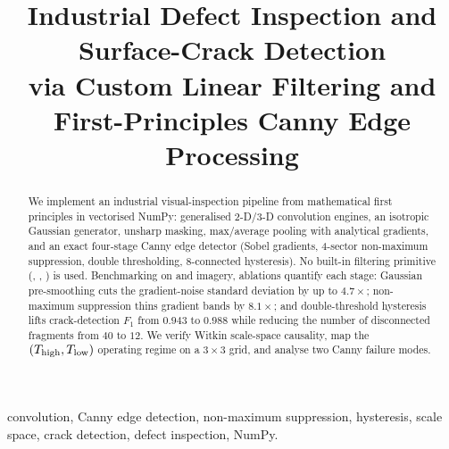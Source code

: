 \documentclass[conference]{IEEEtran}
\begin{document}
\title{Industrial Defect Inspection and Surface-Crack Detection\\
via Custom Linear Filtering and First-Principles Canny Edge Processing}

\author{%
}

\maketitle

\begin{abstract}
We implement an industrial visual-inspection pipeline from mathematical first
principles in vectorised NumPy: generalised 2-D/3-D convolution engines, an
isotropic Gaussian generator, unsharp masking, max/average pooling with
analytical gradients, and an exact four-stage Canny edge detector (Sobel
gradients, 4-sector non-maximum suppression, double thresholding, 8-connected
hysteresis). No built-in filtering primitive (,
, ) is used. Benchmarking on \PCB{} and
\CRACK{} imagery, ablations quantify each stage: Gaussian pre-smoothing cuts the
gradient-noise standard deviation by up to $4.7\times$; non-maximum suppression
thins gradient bands by $8.1\times$; and double-threshold hysteresis lifts
crack-detection $F_1$ from $0.943$ to $0.988$ while reducing the number of
disconnected fragments from $40$ to $12$. We verify Witkin scale-space
causality, map the $(T_{\text{high}},T_{\text{low}})$ operating regime on a $3\times3$ grid, and
analyse two Canny failure modes.
\end{abstract}

\begin{IEEEkeywords}
convolution, Canny edge detection, non-maximum suppression, hysteresis,
scale space, crack detection, defect inspection, NumPy.
\end{IEEEkeywords}










\end{document}

